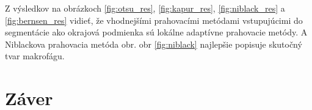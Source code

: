 \documentclass[a4paper,12pt,twoside]{article}%
\begin{document}
Z výsledkov na obrázkoch \ref{fig:otsu_res}, \ref{fig:kapur_res}, \ref{fig:niblack_res} a \ref{fig:bernsen_res}  vidieť, že vhodnejšími prahovacími metódami vstupujúcimi do segmentácie ako okrajová podmienka sú lokálne adaptívne prahovacie metódy. A Niblackova prahovacia metóda obr. obr \ref{fig:niblack} najlepšie popisuje skutočný tvar makrofágu.

\newpage
\section{Záver}


\newpage
\begin{thebibliography}{50}
\end{thebibliography}
\end{document}
